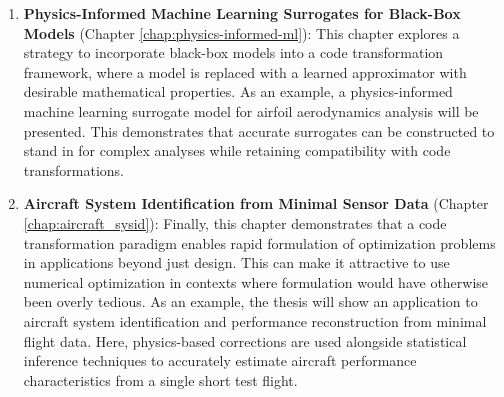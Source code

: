 \begin{enumerate}
    \item \textbf{Physics-Informed Machine Learning Surrogates for Black-Box Models} (Chapter \ref{chap:physics-informed-ml}): This chapter explores a strategy to incorporate black-box models into a code transformation framework, where a model is replaced with a learned approximator with desirable mathematical properties. As an example, a physics-informed machine learning surrogate model for airfoil aerodynamics analysis will be presented. This demonstrates that accurate surrogates can be constructed to stand in for complex analyses while retaining compatibility with code transformations.
    \item \textbf{Aircraft System Identification from Minimal Sensor Data} (Chapter \ref{chap:aircraft_sysid}): Finally, this chapter demonstrates that a code transformation paradigm enables rapid formulation of optimization problems in applications beyond just design. This can make it attractive to use numerical optimization in contexts where formulation would have otherwise been overly tedious. As an example, the thesis will show an application to aircraft system identification and performance reconstruction from minimal flight data. Here, physics-based corrections are used alongside statistical inference techniques to accurately estimate aircraft performance characteristics from a single short test flight.
\end{enumerate}

